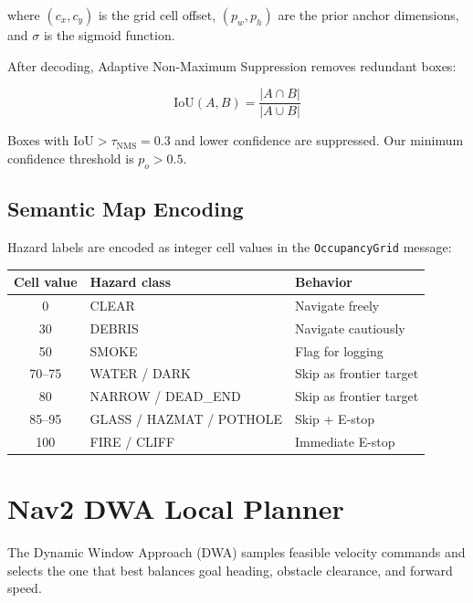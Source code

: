 \documentclass[12pt,a4paper]{article}
\begin{document}
where $(c_x, c_y)$ is the grid cell offset, $(p_w, p_h)$ are the prior
anchor dimensions, and $\sigma$ is the sigmoid function.

After decoding, Adaptive Non-Maximum Suppression removes redundant boxes:

\begin{equation}
  \text{IoU}(A,B) = \frac{|A \cap B|}{|A \cup B|}
  \tag{20}
\end{equation}

Boxes with $\text{IoU} > \tau_{\text{NMS}} = 0.3$ and lower confidence
are suppressed. Our minimum confidence threshold is $p_o > 0.5$.

\subsection{Semantic Map Encoding}

Hazard labels are encoded as integer cell values in the
\texttt{OccupancyGrid} message:

\begin{center}
\begin{tabular}{c l l}
  \toprule
  Cell value & Hazard class & Behavior \\
  \midrule
  0   & CLEAR                  & Navigate freely \\
  30  & DEBRIS                 & Navigate cautiously \\
  50  & SMOKE                  & Flag for logging \\
  70--75 & WATER / DARK        & Skip as frontier target \\
  80  & NARROW / DEAD\_END     & Skip as frontier target \\
  85--95 & GLASS / HAZMAT / POTHOLE & Skip + E-stop \\
  100 & FIRE / CLIFF           & Immediate E-stop \\
  \bottomrule
\end{tabular}
\end{center}

\newpage
\section{Nav2 DWA Local Planner}

The Dynamic Window Approach (DWA) samples feasible velocity commands and
selects the one that best balances goal heading, obstacle clearance,
and forward speed.
\end{document}
